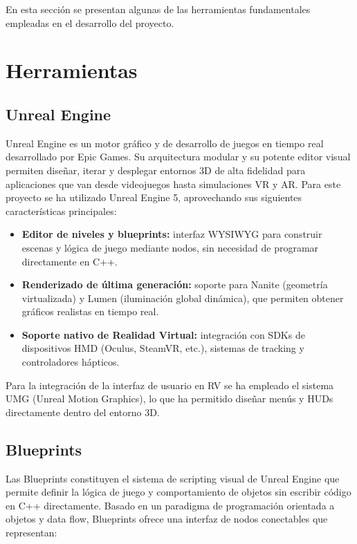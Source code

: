 
En esta sección se presentan algunas de las herramientas fundamentales empleadas en el desarrollo del proyecto.
\section{Herramientas}
\subsection{Unreal Engine}

Unreal Engine es un motor gráfico y de desarrollo de juegos en tiempo real desarrollado por Epic Games. Su arquitectura modular y su potente editor visual permiten diseñar, iterar y desplegar entornos 3D de alta fidelidad para aplicaciones que van desde videojuegos hasta simulaciones VR y AR. Para este proyecto se ha utilizado Unreal Engine 5, aprovechando sus siguientes características principales:

\begin{itemize}
  \item \textbf{Editor de niveles y blueprints:} interfaz WYSIWYG para construir escenas y lógica de juego mediante nodos, sin necesidad de programar directamente en C++.
  \item \textbf{Renderizado de última generación:} soporte para Nanite (geometría virtualizada) y Lumen (iluminación global dinámica), que permiten obtener gráficos realistas en tiempo real.
  \item \textbf{Soporte nativo de Realidad Virtual:} integración con SDKs de dispositivos HMD (Oculus, SteamVR, etc.), sistemas de tracking y controladores hápticos.
\end{itemize}

Para la integración de la interfaz de usuario en RV se ha empleado el sistema UMG (Unreal Motion Graphics), lo que ha permitido diseñar menús y HUDs directamente dentro del entorno 3D.

\subsection{Blueprints} 
Las Blueprints constituyen el sistema de scripting visual de Unreal Engine que permite definir la lógica de juego y comportamiento de objetos sin escribir código en C++ directamente. Basado en un paradigma de programación orientada a objetos y data flow, Blueprints ofrece una interfaz de nodos conectables que representan:

